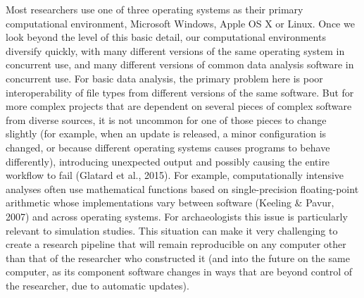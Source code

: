 \documentclass[american,man]{apa6}
\begin{document}
Most researchers use one of three operating systems as their primary
computational environment, Microsoft Windows, Apple OS X or Linux. Once
we look beyond the level of this basic detail, our computational
environments diversify quickly, with many different versions of the same
operating system in concurrent use, and many different versions of
common data analysis software in concurrent use. For basic data
analysis, the primary problem here is poor interoperability of file
types from different versions of the same software. But for more complex
projects that are dependent on several pieces of complex software from
diverse sources, it is not uncommon for one of those pieces to change
slightly (for example, when an update is released, a minor configuration
is changed, or because different operating systems causes programs to
behave differently), introducing unexpected output and possibly causing
the entire workflow to fail (Glatard et al., 2015). For example,
computationally intensive analyses often use mathematical functions
based on single-precision floating-point arithmetic whose
implementations vary between software (Keeling \& Pavur, 2007) and
across operating systems. For archaeologists this issue is particularly
relevant to simulation studies. This situation can make it very
challenging to create a research pipeline that will remain reproducible
on any computer other than that of the researcher who constructed it
(and into the future on the same computer, as its component software
changes in ways that are beyond control of the researcher, due to
automatic updates).
\end{document}
